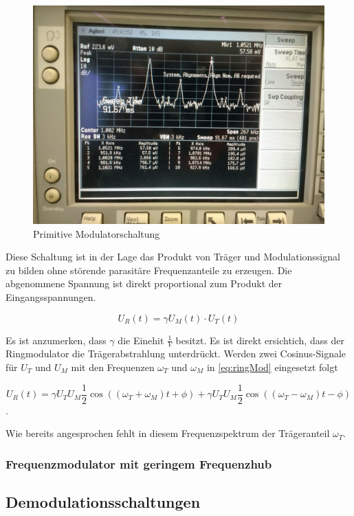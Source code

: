 \begin{figure}
	\centering
	\includegraphics[width=\textwidth]{img/Aufgabenteil_b.jpg}
	\caption{Primitive Modulatorschaltung}
	\label{abb:ringMod}
\end{figure}

Diese Schaltung ist in der Lage das Produkt von Träger und Modulationssignal zu bilden ohne störende parasitäre Frequenzanteile zu erzeugen. Die abgenommene Spannung ist direkt proportional zum Produkt der Eingangsspannungen.

\begin{equation}
U_R(t) = \gamma U_M(t) \cdot U_T(t)
\label{eq:ringMod}
\end{equation}

Es ist anzumerken, dass $\gamma$ die Einehit $\frac{1}{V}$ besitzt. Es ist direkt ersichtich, dass der Ringmodulator die Trägerabstrahlung unterdrückt. Werden zwei Cosinus-Signale für $U_T$ und $U_M$ mit den Frequenzen $\omega_T$ und $\omega_M$ in \ref{eq:ringMod} eingesetzt folgt

\begin{equation}
U_R(t) = \gamma U_T U_M \frac{1}{2}\cos((\omega_T + \omega_M)t + \phi) + \gamma U_T U_M \frac{1}{2} \cos((\omega_T - \omega_M)t - \phi)
\end{equation}
.

Wie bereits angesprochen fehlt in diesem Frequenzspektrum der Trägeranteil $\omega_T$.

\subsubsection{Frequenzmodulator mit geringem Frequenzhub}
\subsection{Demodulationsschaltungen}